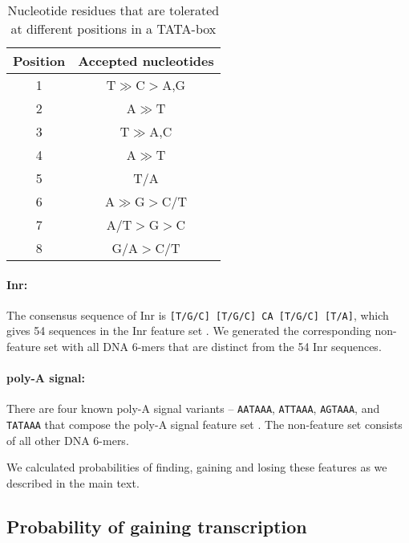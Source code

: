 \documentclass[12pt,a4paper]{article}
\begin{document}
\begin{table}[!t]
\centering
\begin{tabular}{c c}
\toprule
Position  & Accepted nucleotides \\ \midrule
1         & T$\gg$C$>$A,G        \\ \midrule
2         & A$\gg$T               \\ \midrule
3         & T$\gg$A,C             \\ \midrule
4         & A$\gg$T               \\ \midrule
5         & T/A                   \\ \midrule
6         & A$\gg$G$>$C/T         \\ \midrule
7         & A/T$>$G$>$C           \\ \midrule
8         & G/A$>$C/T             \\ \bottomrule
\end{tabular}
\caption{Nucleotide residues that are tolerated at different positions in a TATA-box \citep[based on][]{tata1}}
\label{tatatab}
\end{table}


\paragraph{Inr:} The consensus sequence of Inr is \texttt{[T/G/C] [T/G/C] CA [T/G/C] [T/A]}, which gives 54 sequences in the Inr feature set \citep{Inr}. We generated the corresponding non-feature set with all DNA 6-mers that are distinct from the 54 Inr sequences.

\paragraph{poly-A signal:} There are four known poly-A signal variants -- \texttt{AATAAA}, \texttt{ATTAAA}, \texttt{AGTAAA}, and \texttt{TATAAA} that compose the poly-A signal feature set \citep{polyA}. The non-feature set consists of all other DNA 6-mers.

\vspace{1\baselineskip}

We calculated probabilities of finding, gaining and losing these features as we described in the main text.

\subsection{Probability of gaining transcription}
\end{document}
